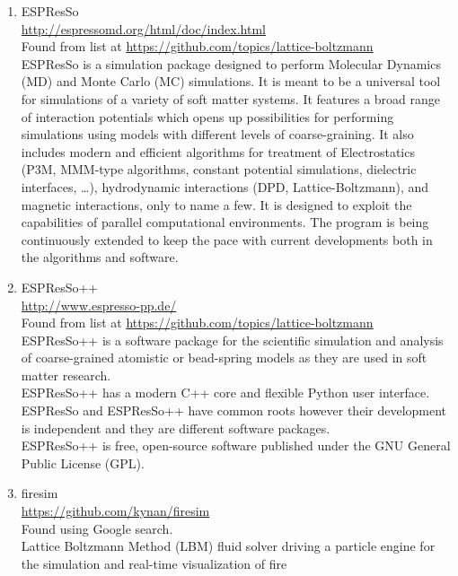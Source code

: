 \documentclass{article}
\begin{document}
\begin{enumerate}
\item ESPResSo
\\
\href{http://espressomd.org/html/doc/index.html}{http://espressomd.org/html/doc/index.html}
\\
Found from list at \href{https://github.com/topics/lattice-boltzmann}{https://github.com/topics/lattice-boltzmann}\\
ESPResSo is a simulation package designed to perform Molecular Dynamics (MD) and Monte Carlo (MC) simulations. It is meant to be a universal tool for simulations of a variety of soft matter systems. It features a broad range of interaction potentials which opens up possibilities for performing simulations using models with different levels of coarse-graining. It also includes modern and efficient algorithms for treatment of Electrostatics (P3M, MMM-type algorithms, constant potential simulations, dielectric interfaces, …), hydrodynamic interactions (DPD, Lattice-Boltzmann), and magnetic interactions, only to name a few. It is designed to exploit the capabilities of parallel computational environments. The program is being continuously extended to keep the pace with current developments both in the algorithms and software.

\item ESPResSo++
\\
\href{http://www.espresso-pp.de/}{http://www.espresso-pp.de/}
\\
Found from list at \href{https://github.com/topics/lattice-boltzmann}{https://github.com/topics/lattice-boltzmann}\\
ESPResSo++ is a software package for the scientific simulation and analysis of coarse-grained atomistic or bead-spring models as they are used in soft matter research.\\
ESPResSo++ has a modern C++ core and flexible Python user interface.\\
ESPResSo and ESPResSo++ have common roots however their development is independent and they are different software packages.\\
ESPResSo++ is free, open-source software published under the GNU General Public License (GPL).

\item firesim \\ 
\href{https://github.com/kynan/firesim}{https://github.com/kynan/firesim}
\\
Found using Google search.\\
Lattice Boltzmann Method (LBM) fluid solver driving a particle engine for the simulation and real-time visualization of fire


\end{enumerate}
\end{document}
